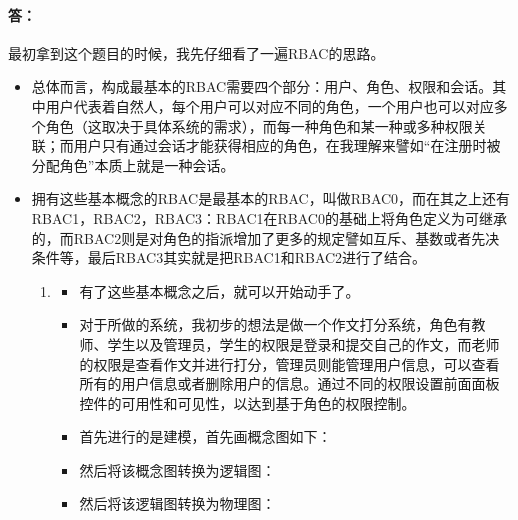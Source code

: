 \paragraph{答：}
最初拿到这个题目的时候，我先仔细看了一遍RBAC的思路。
\begin{itemize}
	\item 总体而言，构成最基本的RBAC需要四个部分：用户、角色、权限和会话。其中用户代表着自然人，每个用户可以对应不同的角色，一个用户也可以对应多个角色（这取决于具体系统的需求），而每一种角色和某一种或多种权限关联；而用户只有通过会话才能获得相应的角色，在我理解来譬如“在注册时被分配角色”本质上就是一种会话。
	
	\item 拥有这些基本概念的RBAC是最基本的RBAC，叫做RBAC0，而在其之上还有RBAC1，RBAC2，RBAC3：RBAC1在RBAC0的基础上将角色定义为可继承的，而RBAC2则是对角色的指派增加了更多的规定譬如互斥、基数或者先决条件等，最后RBAC3其实就是把RBAC1和RBAC2进行了结合。
	
	\begin{enumerate}
		\item
		\begin{itemize}
			\item 有了这些基本概念之后，就可以开始动手了。
			
			\item 对于所做的系统，我初步的想法是做一个作文打分系统，角色有教师、学生以及管理员，学生的权限是登录和提交自己的作文，而老师的权限是查看作文并进行打分，管理员则能管理用户信息，可以查看所有的用户信息或者删除用户的信息。通过不同的权限设置前面面板控件的可用性和可见性，以达到基于角色的权限控制。
			
			\item 首先进行的是建模，首先画概念图如下：
			
			\begin{minipage}{\textwidth}
				
			\end{minipage}
			
			\newpage
			
			\item
			然后将该概念图转换为逻辑图：
			\begin{minipage}{\textwidth}
				
			\end{minipage}
			
			\newpage
			
			\item
			然后将该逻辑图转换为物理图：
			\begin{minipage}{\textwidth}
				
			\end{minipage}
			

\end{itemize}
\end{enumerate}
\end{itemize}
